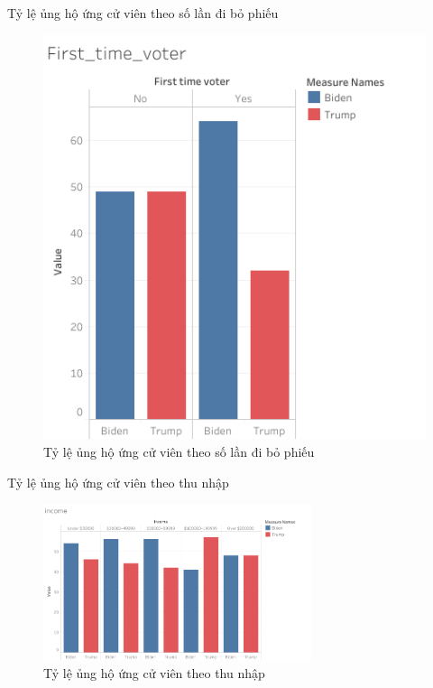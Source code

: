 \documentclass[10pt]{beamer}
\theoremstyle{remark}
\theoremstyle{definition}
\begin{document}
\begin{frame}{Tỷ lệ ủng hộ ứng cử viên theo số lần đi bỏ phiếu}
	\begin{figure}[h!]
        \centering
        \includegraphics[height=0.65\textheight]{figures/First_time_voter.png}
        \caption{Tỷ lệ ủng hộ ứng cử viên theo số lần đi bỏ phiếu}
    \end{figure}
\end{frame}

\begin{frame}{Tỷ lệ ủng hộ ứng cử viên theo thu nhập}
	\begin{figure}[h!]
        \centering
        \includegraphics[width=0.7\textwidth]{figures/income.png}
        \caption{Tỷ lệ ủng hộ ứng cử viên theo thu nhập}
    \end{figure}
\end{frame}
\end{document}
